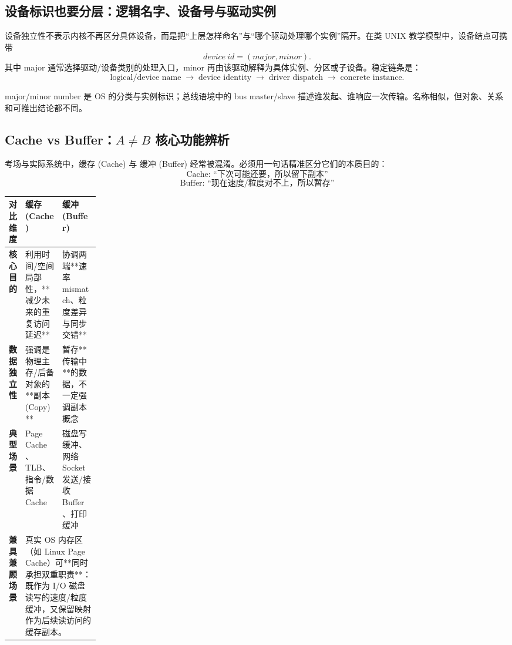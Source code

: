 \documentclass[UTF8,fontset=fandol,11pt,a4paper]{ctexart}
\newcommand{\arr}{\;\longrightarrow\;}
\begin{document}
\subsection{设备标识也要分层：逻辑名字、设备号与驱动实例}

设备独立性不表示内核不再区分具体设备，而是把“上层怎样命名”与“哪个驱动处理哪个实例”隔开。在类 UNIX 教学模型中，设备结点可携带
\[
\boxed{device\ id=(major,minor)}.
\]
其中 major 通常选择驱动/设备类别的处理入口，minor 再由该驱动解释为具体实例、分区或子设备。稳定链条是：
\[
\text{logical/device name}
\arr\text{device identity}
\arr\text{driver dispatch}
\arr\text{concrete instance}.
\]

\begin{warn}
major/minor number 是 OS 的分类与实例标识；总线语境中的 bus master/slave 描述谁发起、谁响应一次传输。名称相似，但对象、关系和可推出结论都不同。
\end{warn}

\subsection{Cache vs Buffer：\texorpdfstring{$A\neq B$}{A != B} 核心功能辨析}

考场与实际系统中，缓存 (Cache) 与 缓冲 (Buffer) 经常被混淆。必须用一句话精准区分它们的本质目的：
\[
\boxed{\text{Cache: “下次可能还要，所以留下副本”}}
\]
\[
\boxed{\text{Buffer: “现在速度/粒度对不上，所以暂存”}}
\]

\begingroup
\small
\renewcommand{\arraystretch}{1.25}
\setlength{\tabcolsep}{6pt}
\begin{tabularx}{\linewidth}{>{\bfseries}p{0.18\linewidth} X X}
\toprule
对比维度 & 缓存 (Cache) & 缓冲 (Buffer)\\
\midrule
核心目的 & 利用时间/空间局部性，**减少未来的重复访问延迟** & 协调两端**速率 mismatch、粒度差异与同步交错**\\
数据独立性 & 强调是物理主存/后备对象的**副本 (Copy)** & 暂存**传输中**的数据，不一定强调副本概念\\
典型场景 & Page Cache、TLB、指令/数据 Cache & 磁盘写缓冲、网络 Socket 发送/接收 Buffer、打印缓冲\\
兼具兼顾场景 & \multicolumn{2}{p{0.75\linewidth}}{真实 OS 内存区（如 Linux Page Cache）可**同时承担双重职责**：既作为 I/O 磁盘读写的速度/粒度缓冲，又保留映射作为后续读访问的缓存副本。}\\
\bottomrule
\end{tabularx}
\endgroup
\end{document}
